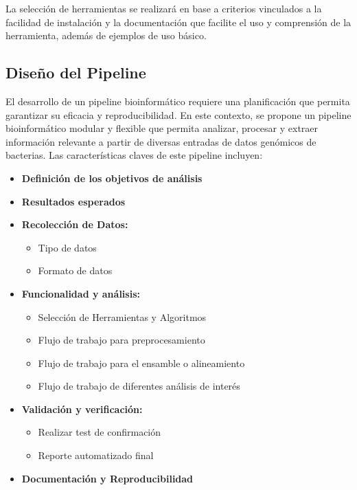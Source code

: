 \documentclass[12pt]{article}
\begin{document}
La selección  de herramientas se realizará en base a 
criterios vinculados a la facilidad de instalación y la 
documentación que facilite el uso y comprensión  de la 
herramienta, además de ejemplos de uso básico.

\subsection*{Diseño del Pipeline}

El desarrollo de un pipeline bioinformático requiere 
una planificación que permita garantizar su eficacia y
reproducibilidad. En este contexto, se propone un 
pipeline bioinformático modular y flexible que permita 
analizar, procesar y extraer información relevante a partir 
de diversas entradas de datos genómicos de bacterias. Las 
características claves de este pipeline incluyen:

\begin{itemize}
    \item \textbf{Definición de los objetivos de análisis}
    \item \textbf{Resultados esperados}
    \item \textbf{Recolección de Datos:}
    \begin{itemize}
        \item Tipo de datos
        \item Formato de datos
    \end{itemize}
    \item \textbf{Funcionalidad y análisis:}
    \begin{itemize}
        \item Selección de Herramientas y Algoritmos
        \item Flujo de trabajo para preprocesamiento
        \item Flujo de trabajo para el ensamble o alineamiento
        \item Flujo de trabajo de diferentes análisis de interés
    \end{itemize}
    \item \textbf{Validación y verificación:}
    \begin{itemize}
        \item Realizar test de confirmación
        \item Reporte automatizado final
    \end{itemize}
    \item \textbf{Documentación y Reproducibilidad}
\end{itemize}
\end{document}
